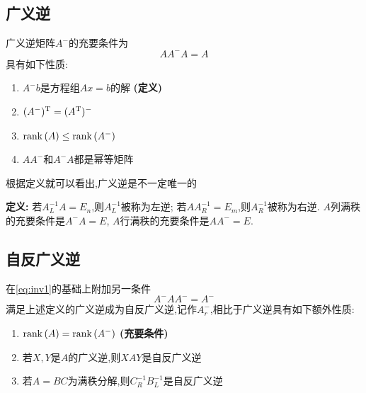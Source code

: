 \documentclass{matrix-review}
\begin{document}
\subsection{广义逆}
广义逆矩阵$A^-$的充要条件为\begin{equation}\label{eq:inv1}
    AA^-A=A
\end{equation}具有如下性质:
\begin{enumerate}
    \item $A^-b$是方程组$Ax=b$的解 \textbf{(定义)}
    \item $(A^-)^{\mathrm{T}}=(A^{\mathrm{T}})^-$
    \item $\mathrm{rank}\left(A\right)\le\mathrm{rank}\left(A^-\right)$
    \item $AA^-$和$A^-A$都是幂等矩阵
\end{enumerate}

\begin{remarkbox}
    根据定义就可以看出,广义逆是不一定唯一的
\end{remarkbox}

\textbf{定义:} 若$A_L^{-1}A=E_n$,则$A_L^{-1}$被称为左逆; 若$AA^{-1}_R=E_m$,则$A_R^{-1}$被称为右逆.
$A$列满秩的充要条件是$A^-A=E$, $A$行满秩的充要条件是$AA^-=E$.

\subsection{自反广义逆}
在\eqref{eq:inv1}的基础上附加另一条件\begin{equation}\label{eq:inv2}
    A^-AA^-=A^-
\end{equation}
满足上述定义的广义逆成为自反广义逆,记作$A_r^-$,相比于广义逆具有如下额外性质:
\begin{enumerate}
    \item $\mathrm{rank}\left(A\right)=\mathrm{rank}\left(A^-\right)$ \textbf{(充要条件)}
    \item 若$X,Y$是$A$的广义逆,则$XAY$是自反广义逆
    \item 若$A=BC$为满秩分解,则$C^{-1}_RB^{-1}_L$是自反广义逆
\end{enumerate}
\end{document}

